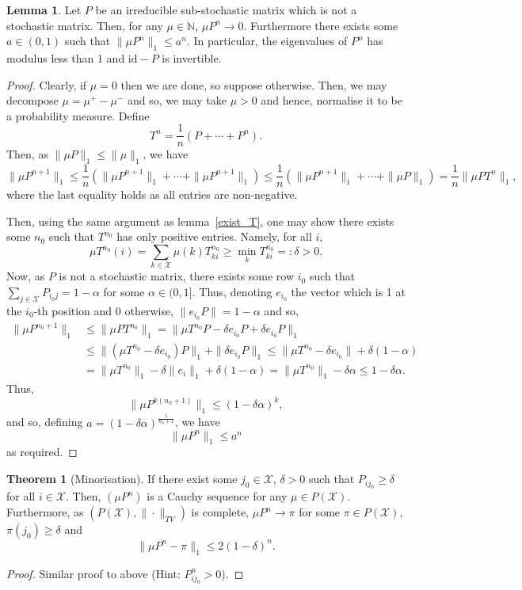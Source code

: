 \documentclass[]{article}
\theoremstyle{definition}
\newtheorem{theorem}{Theorem}
\theoremstyle{definition}
\newtheorem{lemma}{Lemma}[section]
\begin{document}
\begin{lemma}
  Let \(P\) be an irreducible sub-stochastic matrix which is not a stochastic 
  matrix. Then, for any \(\mu \in \mathbb{N}\), \(\mu P^n \to 0\). Furthermore
  there exists some \(a \in (0, 1)\) such that \(\|\mu P^n\|_1 \le a^n\). 
  In particular, the eigenvalues of \(P^n\) has modulus less than 1 and 
  \(\text{id} - P\) is invertible. 
\end{lemma}
\begin{proof}
  Clearly, if \(\mu = 0\) then we are done, so suppose otherwise. Then, 
  we may decompose \(\mu = \mu^+ - \mu^-\) and so, we may take \(\mu > 0\) 
  and hence, normalise it to be a probability measure. 
  Define 
  \[T^n = \frac{1}{n}(P + \cdots + P^n).\]
  Then, as \(\|\mu P\|_1 \le \|\mu\|_1\), we have 
  \[\|\mu P^{n + 1}\|_1 \le \frac{1}{n} (\|\mu P^{n + 1}\|_1 + \cdots + \|\mu P^{n + 1}\|_1) 
  \le \frac{1}{n}(\|\mu P^{n + 1}\|_1 + \cdots + \|\mu P\|_1)
  = \frac{1}{n} \|\mu P T^n\|_1,\]
  where the last equality holds as all entries are non-negative.

  Then, using the same argument as lemma~\ref{exist_T}, one may show there exists some 
  \(n_0\) such that \(T^{n_0}\) has only positive entries. Namely, for all \(i\),
  \[\mu T^{n_0}(i) = \sum_{k \in \mathcal{X}} \mu(k) T^{n_0}_{ki} \ge \min_{k} T_{ki}^{n_0} =: \delta > 0.\]
  Now, as \(P\) is not a stochastic matrix, there exists some row \(i_0\) such that 
  \(\sum_{j \in \mathcal{X}} P_{i_0 j} = 1 - \alpha\) for some \(\alpha \in (0, 1]\).
  Thus, denoting \(e_{i_0}\) the vector which is 1 at the \(i_0\)-th position and 
  0 otherwise, \(\|e_{i_0} P\| = 1 - \alpha\) and so, 
  \[\begin{split}
    \|\mu P^{n_0 + 1}\|_1 & \le \|\mu P T^{n_0}\|_1 = 
    \|\mu T^{n_0} P - \delta e_{i_0} P + \delta e_{i_0} P\|_1\\
    & \le \|(\mu T^{n_0} - \delta e_{i_0}) P\|_1 + \|\delta e_{i_0} P\|_1
    \le \|\mu T^{n_0} - \delta e_{i_0}\| + \delta(1 - \alpha)\\
    & = \|\mu T^{n_0}\|_1 - \delta\|e_i\|_1 + \delta(1 - \alpha)
    = \|\mu T^{n_0}\|_1 - \delta \alpha \le 1 - \delta \alpha.
  \end{split}\]
  Thus, 
  \[\|\mu P^{k(n_0 + 1)}\|_1 \le (1 - \delta \alpha)^k,\]
  and so, defining \(a = (1 - \delta \alpha)^{\frac{1}{n_0 + 1}}\), we have 
  \[\|\mu P^n\|_1 \le a^n\]
  as required.
\end{proof}

\begin{theorem}[Minorisation]
  If there exist some \(j_0 \in \mathcal{X}\), \(\delta > 0\) such that 
  \(P_{ij_0} \ge \delta\) for all \(i \in \mathcal{X}\). Then, \((\mu P^n)\) 
  is a Cauchy sequence for any \(\mu \in P(\mathcal{X})\). Furthermore, 
  as \((P(\mathcal{X}), \|\cdot\|_{TV})\) is complete, \(\mu P^n \to \pi\) 
  for some \(\pi \in P(\mathcal{X})\), \(\pi(j_0) \ge \delta\) and 
  \[\|\mu P^n - \pi\|_1 \le 2(1 - \delta)^n.\]
\end{theorem}
\begin{proof}
  Similar proof to above (Hint: \(P^n_{ij_0} > 0\)).
\end{proof}
\end{document}
